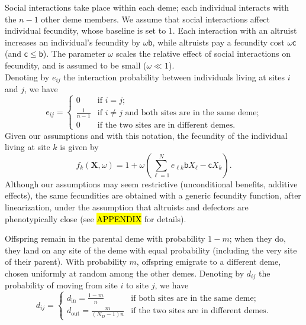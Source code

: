 \documentclass[11pt, letterpaper]{article}
\newcommand{\bb}{\mathsf{b}}
\newcommand{\cc}{\mathsf{c}}
\newcommand{\din}{d_{\textrm{in}}}
\newcommand{\dout}{d_{\textrm{out}}}
\newcommand{\ndemes}{N_D}
\begin{document}
Social interactions take place within each deme; each individual interacts with the $n-1$ other deme members. We assume that social interactions affect individual fecundity, whose baseline is set to $1$. Each interaction with an altruist increases an individual's fecundity by $\omega \bb$, while altruists pay a fecundity cost $\omega \cc$ (and $\cc \leq \bb$). The parameter $\omega$ scales the relative effect of social interactions on fecundity, and is assumed to be small ($\omega \ll 1$). \\
Denoting by $e_{ij}$ the interaction probability between individuals living at sites $i$ and $j$, we have
\begin{equation}\label{eq:defE}
e_{ij} = \begin{cases}
 0 & \textrm{if $i=j$;}\\
 \frac{1}{n-1} & \textrm{if $i\neq j$ and both sites are in the same deme;}\\
 0 & \textrm{if the two sites are in different demes.} 
\end{cases}
\end{equation}
Given our assumptions and with this notation, the fecundity of the individual living at site $k$ is given by 
\begin{equation}
f_k(\mathbf{X}, \omega) = 1 + \omega \left( \sum_{\ell =1}^N e_{\ell k} \bb X_{\ell} - \cc X_k \right).
\end{equation}
Although our assumptions may seem restrictive (unconditional benefits, additive effects), the same fecundities are obtained with a generic fecundity function, after linearization, under the assumption that altruists and defectors are phenotypically close (see \hl{APPENDIX} for details).

Offspring remain in the parental deme with probability $1-m$; when they do, they land on any site of the deme with equal probability (including the very site of their parent). With probability $m$, offspring emigrate to a different deme, chosen uniformly at random among the other demes. Denoting by $d_{ij}$ the probability of moving from site $i$ to site $j$, we have
\begin{equation}\label{eq:defD}
d_{ij} = \begin{cases}
 \din =  \frac{1-m}{n} & \textrm{if both sites are in the same deme;}\\
 \dout = \frac{m}{(\ndemes-1) n} & \textrm{if the two sites are in different demes.} 
\end{cases}
\end{equation}
\end{document}
